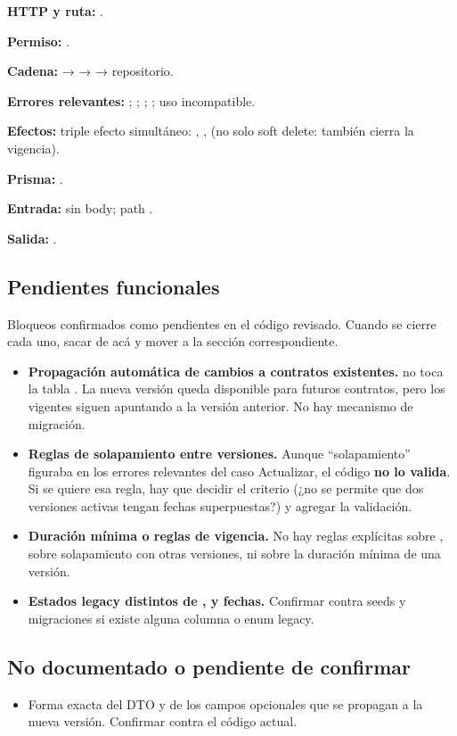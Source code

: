 \textbf{HTTP y ruta:} \texttt{}.  

\textbf{Permiso:} \texttt{}.  

\textbf{Cadena:} \texttt{} → \texttt{} → \texttt{} → repositorio.  

\textbf{Errores relevantes:} \texttt{}; \texttt{}; \texttt{}; \texttt{}; uso incompatible.  

\textbf{Efectos:} triple efecto simult\'aneo: \texttt{}, \texttt{}, \texttt{} (no solo soft delete: tambi\'en cierra la vigencia).

\textbf{Prisma:} \texttt{}.  

\textbf{Entrada:} sin body; path \texttt{}.  

\textbf{Salida:} \texttt{}.


\subsection{Pendientes funcionales}

Bloqueos confirmados como pendientes en el código revisado. Cuando se cierre cada uno, sacar de acá y mover a la sección correspondiente.

\begin{itemize}
\item \textbf{Propagación automática de cambios a contratos existentes.} \texttt{} no toca la tabla \texttt{}. La nueva versión queda disponible para futuros contratos, pero los vigentes siguen apuntando a la versión anterior. No hay mecanismo de migración.
\item \textbf{Reglas de solapamiento entre versiones.} Aunque ``solapamiento'' figuraba en los errores relevantes del caso Actualizar, el código \textbf{no lo valida}. Si se quiere esa regla, hay que decidir el criterio (¿no se permite que dos versiones activas tengan fechas superpuestas?) y agregar la validación.
\item \textbf{Duración mínima o reglas de vigencia.} No hay reglas explícitas sobre \texttt{}, sobre solapamiento con otras versiones, ni sobre la duración mínima de una versión.
\item \textbf{Estados legacy distintos de \texttt{}, \texttt{} y fechas.} Confirmar contra seeds y migraciones si existe alguna columna o enum legacy.
\end{itemize}

\subsection{No documentado o pendiente de confirmar}


\begin{itemize}
\item Forma exacta del DTO \texttt{} y de los campos opcionales que se propagan a la nueva versión. Confirmar contra el código actual.
\end{itemize}
